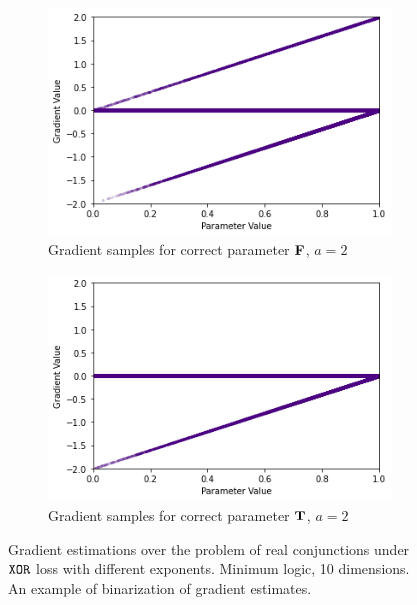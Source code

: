 \begin{figure}[h]
\begin{subfigure}[b]{0.47\textwidth}
        \includegraphics[width=\textwidth]{imgs/grad_min_2_falseparam.png}
        \caption{Gradient samples for correct parameter $\textbf{F}$, $a=2$}
        \label{fig:conjgrad10falseavgm}
    \end{subfigure}
    \begin{subfigure}[b]{0.47\textwidth}
        \centering
        \includegraphics[width=\textwidth]{imgs/grad_min_2_trueparam.png}
        \caption{Gradient samples for correct parameter $\textbf{T}$, $a=2$}
        \label{fig:conjgrad10trueavgm}
    \end{subfigure}
       \caption{Gradient estimations over the problem of real conjunctions under $\texttt{XOR}$ loss with different exponents. Minimum logic, 10 dimensions. An example of binarization of gradient estimates.}
       \label{fig:conjgrad10m}
\end{figure}
